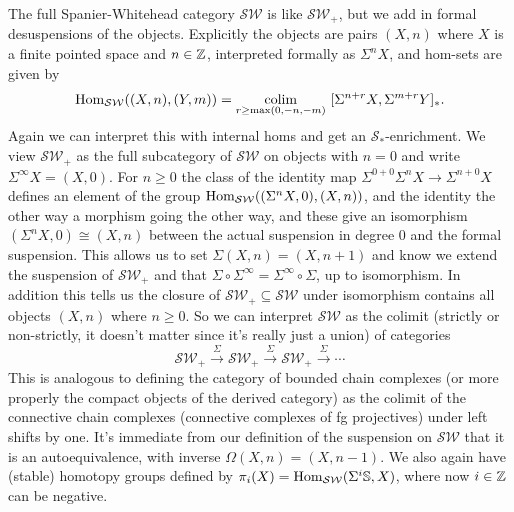 The full Spanier-Whitehead category \(\mathcal{SW}\) is like \(\mathcal{SW}_+\), but we add in formal desuspensions of the objects. Explicitly the objects are pairs \((X, n)\) where \(X\) is a finite pointed space and \(n \in \mathbb{Z}\), interpreted formally as \(\Sigma^n X\), and hom-sets are given by \[\operatorname{Hom}_{\mathcal{SW}}((X, n), (Y, m)) = \operatorname*{colim}\limits_{r \geq \max(0, -n, -m)}\ [\Sigma^{n + r} X, \Sigma^{m + r} Y]_*.\]Again we can interpret this with internal homs and get an \(\mathcal{S}_*\)-enrichment. We view \(\mathcal{SW}_+\) as the full subcategory of \(\mathcal{SW}\) on objects with \(n = 0\) and write \(\Sigma^\infty X = (X, 0)\). For \(n \geq 0\) the class of the identity map \(\Sigma^{0+0} \Sigma^n X \to \Sigma^{n+0} X\) defines an element of the group \(\operatorname{Hom}_{\mathcal{SW}}((\Sigma^n X, 0), (X, n))\), and the identity the other way a morphism going the other way, and these give an isomorphism \((\Sigma^n X, 0) \cong (X, n)\) between the actual suspension in degree \(0\) and the formal suspension. This allows us to set \(\Sigma (X, n) = (X, n+1)\) and know we extend the suspension of \(\mathcal{SW}_+\) and that \(\Sigma \circ \Sigma^\infty = \Sigma^\infty \circ \Sigma\), up to isomorphism. In addition this tells us the closure of \(\mathcal{SW}_+ \subseteq \mathcal{SW}\) under isomorphism contains all objects \((X, n)\) where \(n \geq 0\). So we can interpret \(\mathcal{SW}\) as the colimit (strictly or non-strictly, it doesn't matter since it's really just a union) of categories \[\mathcal{SW}_+ \overset{\Sigma}{\to} \mathcal{SW}_+ \overset{\Sigma}{\to} \mathcal{SW}_+ \overset{\Sigma}{\to} \cdots\]This is analogous to defining the category of bounded chain complexes (or more properly the compact objects of the derived category) as the colimit of the connective chain complexes (connective complexes of fg projectives) under left shifts by one. It's immediate from our definition of the suspension on \(\mathcal{SW}\) that it is an autoequivalence, with inverse \(\Omega (X, n) = (X, n - 1)\). We also again have (stable) homotopy groups defined by \(\pi_i(X) = \operatorname{Hom}_{\mathcal{SW}}(\Sigma^i \mathbb{S}, X)\), where now \(i \in \mathbb{Z}\) can be negative.

